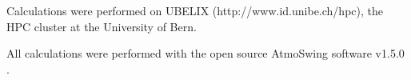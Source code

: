 \documentclass{ametsoc}
\begin{document}
Calculations were performed on UBELIX (http://www.id.unibe.ch/hpc), the HPC cluster at the University of Bern.

All calculations were performed with the open source AtmoSwing software v1.5.0 \citep{Horton2017a}.


%






%
%
%


\end{document}
